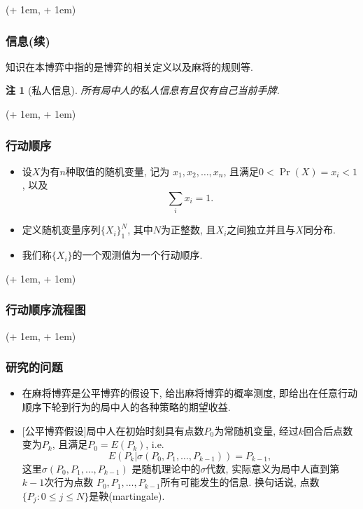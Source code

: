 \documentclass[xcolor=dvipsnames]{ctexbeamer}
\newcommand{\FrameTextCrono}[1]{
    \begin{textblock*}{\paperwidth}(\textwidth + 1em, \textheight + 1em)
        #1
    \end{textblock*}
}
\let\oldframe\frame
\let\oldendframe\endframe
\renewenvironment{frame}
    {\oldframe\FrameTextCrono{\small\color{blue}{\crono}}}
    {\oldendframe}
\newtheorem{note}{注}[section]
\begin{document}
    \begin{frame}
        \frametitle{信息(续)}
        \begin{definition}[知识]
            知识在本博弈中指的是博弈的相关定义以及麻将的规则等.
        \end{definition}
        \begin{note}[私人信息]
            所有局中人的私人信息有且仅有自己当前手牌.
        \end{note}
    \end{frame}
    
    \begin{frame}
        \frametitle{行动顺序}
        \begin{definition}[行动顺序]
            \begin{itemize}
                \item 设$X$为有$n$种取值的随机变量, 记为
                    $x_{1}, x_{2}, \dotsc, x_{n}$,
                    且满足$0<\Pr(X)=x_{i}<1$, 以及
                    \begin{equation}
                        \sum_{i}{x_{i}} = 1.
                    \end{equation}
                \item 定义随机变量序列$\{X_{i}\}_{1}^{N}$, 其中$N$为正整数,
                    且$X_{i}$之间独立并且与$X$同分布.
                \item 我们称$\{X_{i}\}$的一个观测值为一个行动顺序.
            \end{itemize}
        \end{definition}
    \end{frame}

    \begin{frame}
        \frametitle{行动顺序流程图}
    \end{frame}

    \begin{frame}
        \frametitle{研究的问题}
        \begin{itemize}
            \item 在麻将博弈是公平博弈的假设下, 给出麻将博弈的概率测度,
                即给出在任意行动顺序下轮到行为的局中人的各种策略的期望收益.
            \item {[\alert{公平博弈假设}]}局中人在初始时刻具有点数$P_{0}$为常随机变量,
                经过$k$回合后点数变为$P_{k}$, 且满足$P_{0} = E(P_{k})$,
                i.e.
                \begin{equation}
                    E(P_{k}|\sigma(P_{0}, P_{1}, \dotsc, P_{k-1})) = P_{k-1},
                \end{equation}
                这里$\sigma(P_{0}, P_{1}, \dotsc, P_{k-1})$
                是随机理论中的$\sigma$代数,
                实际意义为局中人直到第$k-1$次行为点数
                $P_{0}, P_{1}, \dotsc, P_{k-1}$所有可能发生的信息.
                换句话说, 点数$\{P_{j}: 0\leq j\leq N\}$是鞅(martingale).
        \end{itemize}
    \end{frame}
\end{document}
